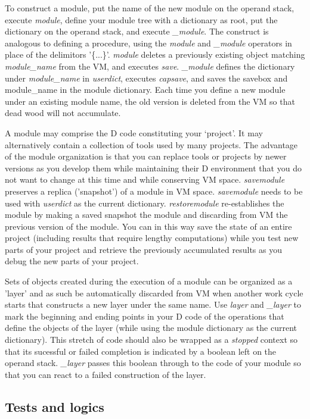 To construct a module, put the name of the new module on the operand stack, execute \emph{module}, define your module tree with a dictionary as root, put the dictionary on the operand stack, and execute \emph{\_module}. The construct is analogous to defining a procedure, using the \emph{module} and \emph{\_module} operators in place of the delimitors '\{...\}'. \emph{module} deletes a previously existing object matching \emph{module\_name} from the VM, and executes \emph{save}. \emph{\_module} defines the dictionary under \emph{module\_name} in \emph{userdict}, executes \emph{capsave}, and saves the savebox and module\_name in the module dictionary. Each time you define a new module under an existing module name, the old version is deleted from the VM so that dead wood will not accumulate.

A module may comprise the D code constituting your `project'. It may alternatively contain a collection of tools used by many projects. The advantage of the module organization is that you can replace tools or projects by newer versions as you develop them while maintaining their D environment that you do not want to change at this time and while conserving VM space. \emph{savemodule} preserves a replica ('snapshot') of a module in VM space. \emph{savemodule} needs to be used with \emph{userdict} as the current dictionary. \emph{restoremodule} re-establishes the module by making a saved snapshot the module and discarding from VM the previous version of the module. You can in this way save the state of an entire project (including results that require lengthy computations) while you test new parts of your project and retrieve the previously accumulated results as you debug the new parts of your project.

Sets of objects created during the execution of a module can be organized as a 'layer' and as such be automatically discarded from VM when another work cycle starts that constructs a new layer under the same name. Use \emph{layer} and \emph{\_layer} to mark the beginning and ending points in your D code of the operations that define the objects of the layer (while using the module dictionary as the current dictionary). This stretch of code should also be wrapped as a \emph{stopped} context so that its sucessful or failed completion is indicated by a boolean left on the operand stack. \emph{\_layer} passes this boolean through to the code of your module so that you can react to a failed construction of the layer.


\subsection{Tests and logics}

